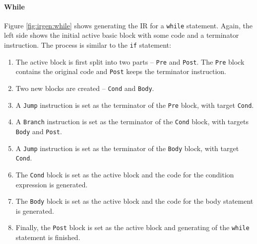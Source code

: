 \paragraph{While} Figure \ref{fig:irgen:while} shows generating the IR for a \texttt{while} statement. Again, the left side shows the initial active basic block with some code and a terminator instruction. The process is similar to the \texttt{if} statement:

\begin{enumerate}[noitemsep]
    \item The active block is first split into two parts -- \texttt{Pre} and \texttt{Post}. The \texttt{Pre} block contains the original code and \texttt{Post} keeps the terminator instruction.
    \item Two new blocks are created -- \texttt{Cond} and \texttt{Body}.
    \item A \texttt{Jump} instruction is set as the terminator of the \texttt{Pre} block, with target \texttt{Cond}.
    \item A \texttt{Branch} instruction is set as the terminator of the \texttt{Cond} block, with targets \texttt{Body} and \texttt{Post}.
    \item A \texttt{Jump} instruction is set as the terminator of the \texttt{Body} block, with target \texttt{Cond}.
    \item The \texttt{Cond} block is set as the active block and the code for the condition expression is generated.
    \item The \texttt{Body} block is set as the active block and the code for the body statement is generated.
    \item Finally, the \texttt{Post} block is set as the active block and generating of the \texttt{while} statement is finished.
\end{enumerate}


